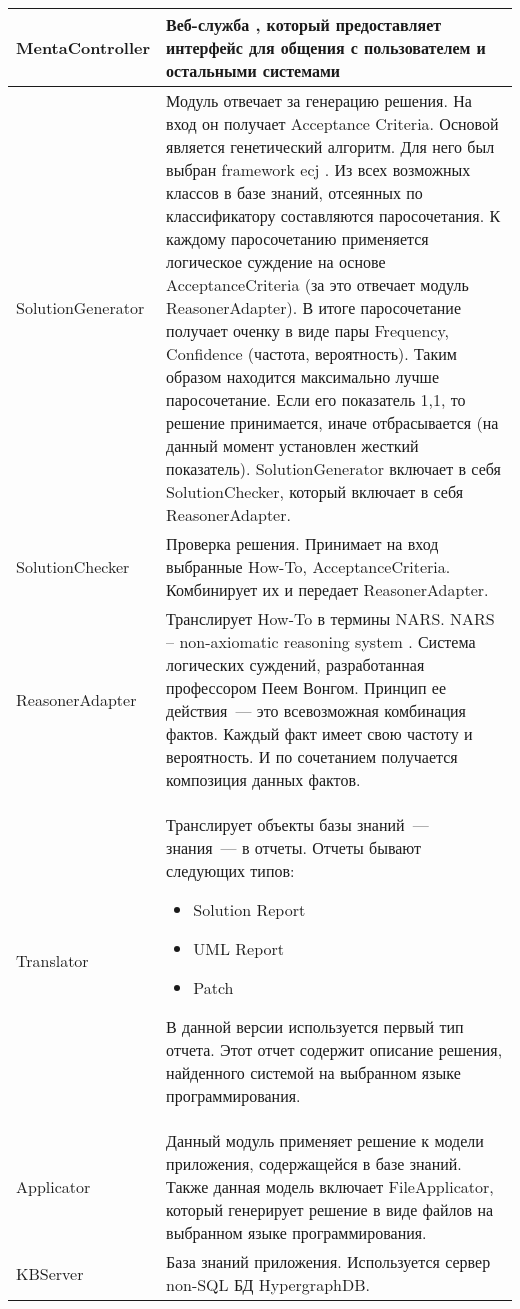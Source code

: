 \begin{longtable}{|p{5cm}|p{10cm}|}
\hline \hline
\endlastfoot
 MentaController & Веб-служба \cite{WebService}, который предоставляет интерфейс для общения с пользователем и остальными системами \\
  \hline
 SolutionGenerator & Модуль отвечает за генерацию решения. На вход он получает Acceptance Criteria. Основой является генетический алгоритм. Для него был выбран framework ecj \cite{ECJ} . Из всех возможных классов в базе знаний, отсеянных по классификатору составляются паросочетания. К каждому паросочетанию применяется логическое суждение на основе AcceptanceCriteria (за это отвечает модуль ReasonerAdapter). В итоге паросочетание получает оченку в виде пары Frequency, Confidence (частота, вероятность). 
Таким образом находится максимально лучше паросочетание. Если его показатель 1,1, то решение принимается, иначе отбрасывается (на данный момент установлен жесткий показатель).
SolutionGenerator включает в себя SolutionChecker, который включает в себя ReasonerAdapter.
 \\
  \hline
SolutionChecker & Проверка решения. Принимает на вход выбранные How-To, AcceptanceCriteria. Комбинирует их и передает ReasonerAdapter. \\
  \hline
ReasonerAdapter & Транслирует  How-To в термины NARS. NARS – non-axiomatic reasoning system \cite{NARS}. Система логических суждений, разработанная профессором Пеем Вонгом. Принцип ее действия~--- это всевозможная комбинация фактов. Каждый факт имеет свою частоту и вероятность. И по сочетанием получается композиция данных фактов.\\
  \hline
  Translator & Транслирует объекты базы знаний~--- знания~--- в отчеты. Отчеты бывают следующих типов:
  \begin{itemize}
  	\item Solution Report
  	\item UML Report
  	\item Patch
  \end{itemize} \par
В данной версии используется первый тип отчета. Этот отчет содержит описание решения, найденного системой на выбранном языке программирования.
\\
  \hline
  Applicator & Данный модуль применяет решение к модели приложения, содержащейся в базе знаний. Также данная модель включает FileApplicator, который генерирует решение в виде файлов на выбранном языке программирования. \\
  \hline
  KBServer & База знаний приложения. Используется сервер non-SQL БД HypergraphDB. \\
  \hline
\end{longtable}
